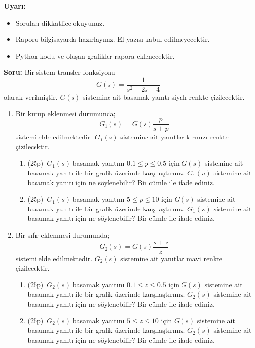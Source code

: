 \noindent\textbf{Uyarı:}
\begin{itemize}\bfseries
    \item Soruları dikkatlice okuyunuz. 
    \item Raporu bilgisayarda hazırlayınız. El yazısı kabul edilmeyecektir.
    \item Python kodu ve oluşan grafikler rapora eklenecektir.
\end{itemize}
\noindent\textbf{Soru:} Bir sistem transfer fonksiyonu 
\begin{equation}
    G(s)=\frac{1}{s^2+2s+4}
\end{equation}
olarak verilmiştir. $G(s)$ sistemine ait basamak yanıtı siyah renkte çizilecektir.

\begin{enumerate}[\bfseries 1.]
    \item Bir kutup eklenmesi durumunda; 
    \begin{equation}
        G_1(s)=G(s)\frac{p}{s+p}
    \end{equation}
    sistemi elde edilmektedir. $G_1(s)$ sistemine ait yanıtlar kırmızı renkte çizilecektir. \begin{enumerate}
        \item (25p)\, $G_1(s)$ basamak yanıtını $0.1\leq p\leq 0.5$ için $G(s)$ sistemine ait basamak yanıtı ile bir grafik üzerinde karşılaştırınız. $G_1(s)$ sistemine ait basamak yanıtı için ne söylenebilir? Bir cümle ile ifade ediniz.
        \item (25p)\, $G_1(s)$ basamak yanıtını $5\leq p\leq 10$ için $G(s)$ sistemine ait basamak yanıtı ile bir grafik üzerinde karşılaştırınız. $G_1(s)$ sistemine ait basamak yanıtı için ne söylenebilir? Bir cümle ile ifade ediniz.
        \end{enumerate}
    \item Bir sıfır eklenmesi durumunda; 
    \begin{equation}
        G_2(s)=G(s)\frac{s+z}{z}
    \end{equation}
    sistemi elde edilmektedir. $G_2(s)$ sistemine ait yanıtlar mavi renkte çizilecektir. \begin{enumerate}
            \item (25p)\, $G_2(s)$ basamak yanıtını $0.1\leq z\leq 0.5$ için $G(s)$ sistemine ait basamak yanıtı ile bir grafik üzerinde karşılaştırınız. $G_2(s)$ sistemine ait basamak yanıtı için ne söylenebilir? Bir cümle ile ifade ediniz.
            \item (25p)\, $G_2(s)$ basamak yanıtını $5\leq z\leq 10$ için $G(s)$ sistemine ait basamak yanıtı ile bir grafik üzerinde karşılaştırınız. $G_2(s)$ sistemine ait basamak yanıtı için ne söylenebilir? Bir cümle ile ifade ediniz.
            \end{enumerate}
\end{enumerate}

